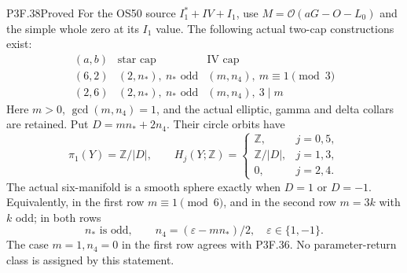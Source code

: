 \begin{statement}{P3F.38}{Proved}
For the OS50 source \(I_1^*+IV+I_1\), use
\(M=\mathcal O(aG-O-L_0)\) and the simple whole zero at its
\(I_1\) value. The following actual two-cap constructions exist:
\[
\begin{array}{c|c|c}
(a,b)&\text{star cap}&\text{IV cap}\\\hline
(6,2)&(2,n_*),\ n_*\text{ odd}&(m,n_4),\ m\equiv1\pmod3\\
(2,6)&(2,n_*),\ n_*\text{ odd}&(m,n_4),\ 3\mid m
\end{array}
\]
Here \(m>0\), \(\gcd(m,n_4)=1\), and the actual elliptic,
gamma and delta collars are retained. Put
\(D=mn_*+2n_4\). Their circle orbits have
\[
 \pi_1(Y)=\mathbb Z/|D|,\qquad
 H_j(Y;\mathbb Z)=
 \begin{cases}\mathbb Z,&j=0,5,\\
 \mathbb Z/|D|,&j=1,3,\\0,&j=2,4.
 \end{cases}
\]
The actual six-manifold is a smooth sphere exactly when
\(D=1\) or \(D=-1\). Equivalently, in the first row
\(m\equiv1\pmod6\), and in the second row \(m=3k\) with
\(k\) odd; in both rows
\[
 n_*\text{ is odd},\qquad
             n_4=(\varepsilon-mn_*)/2,
                    \quad\varepsilon\in\{1,-1\}.
\]
The case \(m=1,n_4=0\) in the first row agrees with P3F.36.
No parameter-return class is assigned by this statement.
\end{statement}


